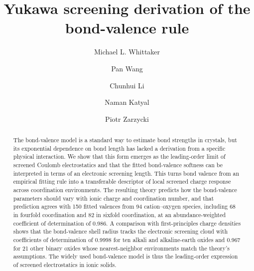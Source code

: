\documentclass[aps,prl,twocolumn,10pt,superscriptaddress,floatfix]{revtex4-2}
\begin{document}
\title{Yukawa screening derivation of the bond-valence rule}

\author{Michael L. Whittaker}

\author{Pan Wang}

\author{Chunhui Li}

\author{Naman Katyal}

\author{Piotr Zarzycki}

\begin{abstract}
The bond-valence model is a standard way to estimate bond strengths in
crystals, but its exponential dependence on bond length has lacked a
derivation from a specific physical interaction.  We show that this form
emerges as the leading-order limit of screened Coulomb electrostatics
and that the fitted bond-valence softness can be interpreted in terms of
an electronic screening length.  This turns bond valence from an
empirical fitting rule into a transferable descriptor of local screened
charge response across coordination environments.  The resulting theory predicts how the
bond-valence parameters should vary with ionic charge and coordination
number, and that prediction agrees with 150 fitted valences from 94
cation--oxygen species, including 68 in fourfold coordination and 
82 in sixfold coordination, at an abundance-weighted
coefficient of determination of 0.986.  A comparison with
first-principles charge densities shows that the bond-valence shell 
radius tracks the electronic screening cloud with coefficients of determination 
of 0.9998 for ten alkali and alkaline-earth oxides and 0.967 for 21 other binary oxides
whose nearest-neighbor environments match the theory's assumptions.  The
widely used bond-valence model is thus the leading-order expression of
screened electrostatics in ionic solids.
\end{abstract}

\maketitle
\end{document}
